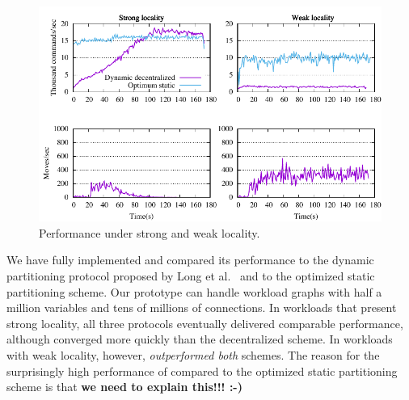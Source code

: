 







\begin{figure}[ht]
	\center
	\includegraphics[width=0.9\linewidth]{figures/motivation}
	\caption{Performance under strong and weak locality.}
	\label{fig:motivation}
\end{figure}



\smallskip


We have fully implemented \dynastar and compared its performance to
the dynamic partitioning protocol proposed by Long et
al.~\cite{hoang2016} and to the optimized static partitioning scheme.
Our prototype can handle workload graphs with half a million variables
and tens of millions of connections.  In workloads that present strong
locality, all three protocols eventually delivered comparable
performance, although \dynastar converged more quickly than the
decentralized scheme.  In workloads with weak locality, however,
\dynastar \emph{outperformed both} schemes.  The reason for the
surprisingly high performance of \dynastar compared to the optimized
static partitioning scheme is that \textbf{we need to explain this!!!
  :-)}

